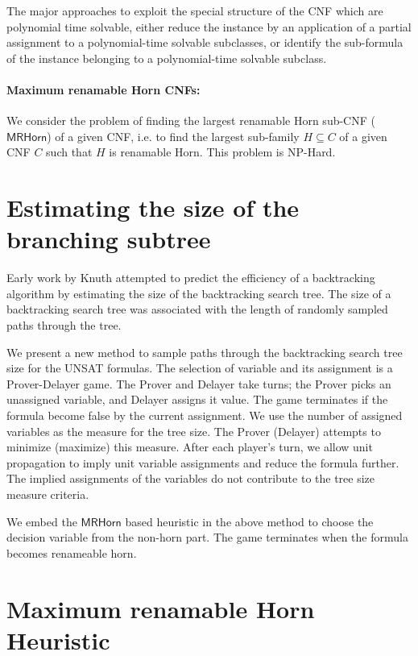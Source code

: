 \documentclass[runningheads]{llncs}
\newcommand{\rhorn}{\mathsf{MRHorn}}
\begin{document}
The major approaches to exploit the special structure of the CNF which are polynomial time solvable, either reduce the instance by an application of a partial assignment to a polynomial-time solvable subclasses, or identify the sub-formula of the instance belonging to a polynomial-time solvable subclass.

\paragraph{\textbf{Maximum renamable Horn CNFs}:}
We consider the problem of finding the largest renamable Horn sub-CNF ($\rhorn$) of a given CNF, i.e. to find the largest sub-family $H \subseteq C$ of a given CNF $C$ such that $H$ is renamable Horn. This problem is NP-Hard.

\section{Estimating the size of the branching subtree} \label{sec:sizetree}
Early work by Knuth \cite{Knuth1975} attempted to predict the efficiency of a backtracking algorithm by estimating the size of the backtracking search tree. The size of a backtracking search tree was associated with the length of randomly sampled paths through the tree.

We present a new method to sample paths through the backtracking search tree size for the UNSAT formulas. The selection of variable and its assignment is a Prover-Delayer game. The Prover and Delayer take turns; the Prover picks an unassigned variable, and Delayer assigns it value. The game terminates if the formula become false by the current assignment. We use the number of assigned variables as the measure for the tree size. The Prover (Delayer) attempts to minimize (maximize) this measure. After each player's turn, we allow unit propagation to imply unit variable assignments and reduce the formula further. The implied assignments of the variables do not contribute to the tree size measure criteria.

We embed the $\rhorn$ based heuristic in the above method to choose the decision variable from the non-horn part. The game terminates when the formula becomes renameable horn.

\section{Maximum renamable Horn Heuristic} \label{sec:renamable-horn}
\end{document}
